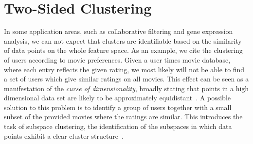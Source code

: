 \section{Two-Sided Clustering}\label{sec:ZS:TwoSided}
In some application areas, such as collaborative filtering and gene expression analysis, we can not expect that clusters are identifiable based on the similarity of data points on the whole feature space. As an example, we cite the clustering of users according to movie preferences. Given a user times movie database, where each entry reflects the given rating, we most likely will not be able to find a set of users which give similar ratings on all movies. This effect can be seen as a manifestation of the \emph{curse of dimensionality}, broadly stating that points in a high dimensional data set are likely to be approximately equidistant~\citep{aggarwal2001surprising,beyer1999nearest}. A possible solution to this problem is to identify a group of users together with a small subset of the provided movies where the ratings are similar. This introduces the task of subspace clustering, the identification of the subspaces in which data points exhibit a clear cluster structure~\citep{kriegel2009clustering}.   

